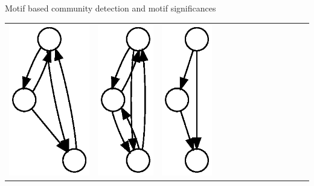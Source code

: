 \documentclass[unknownkeysallowed]{beamer}
\begin{document}
\begin{frame}{Motif based community detection and motif significances}
\begin{tabular}{l|lllllllllllll}
    \includegraphics[height=0.10\textheight]{M3-plain} &
    \includegraphics[height=0.10\textheight]{M4-plain} &
    \includegraphics[height=0.10\textheight]{M5-plain} &

\end{tabular}
\end{frame}
\end{document}
